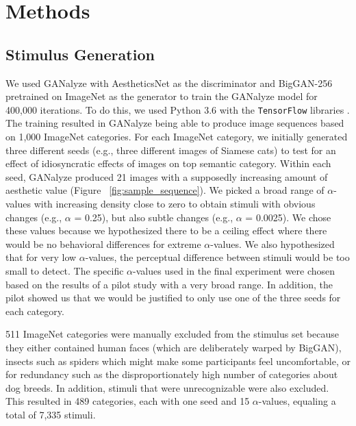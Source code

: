 \documentclass[../main.tex]{subfiles}
\begin{document}
\section{Methods}

	\subsection{Stimulus Generation}
	We used GANalyze with AestheticsNet \parencite{kongPhotoAestheticsRanking2016} as the discriminator and BigGAN-256 \parencite{brockLargeScaleGAN2019} pretrained on ImageNet \parencite{russakovskyImageNetLargeScale2015} as the generator to train the GANalyze model for 400,000 iterations. To do this, we used Python 3.6 with the \texttt{TensorFlow} libraries \parencite{abadi2016tensorflow}. The training resulted in GANalyze being able to produce image sequences based on 1,000 ImageNet categories. For each ImageNet category, we initially generated three different seeds (e.g., three different images of Siamese cats) to test for an effect of idiosyncratic effects of images on top semantic category. Within each seed, GANalyze produced 21 images with a supposedly increasing amount of aesthetic value (Figure ~\ref{fig:sample_sequence}). We picked a broad range of $\alpha$-values with increasing density close to zero to obtain stimuli with obvious changes (e.g., $\alpha$ = 0.25), but also subtle changes (e.g., $\alpha$ = 0.0025). We chose these values because we hypothesized there to be a ceiling effect where there would be no behavioral differences for extreme $\alpha$-values. We also hypothesized that for very low $\alpha$-values, the perceptual difference between stimuli would be too small to detect. The specific $\alpha$-values used in the final experiment were chosen based on the results of a pilot study with a very broad range. In addition, the pilot showed us that we would be justified to only use one of the three seeds for each category.
	
	511 ImageNet categories were manually excluded from the stimulus set because they either contained human faces (which are deliberately warped by BigGAN), insects such as spiders which might make some participants feel uncomfortable, or for redundancy such as the disproportionately high number of categories about dog breeds. In addition, stimuli that were unrecognizable were also excluded. This resulted in 489 categories, each with one seed and 15 $\alpha$-values, equaling a total of 7,335 stimuli.
	
\end{document}
